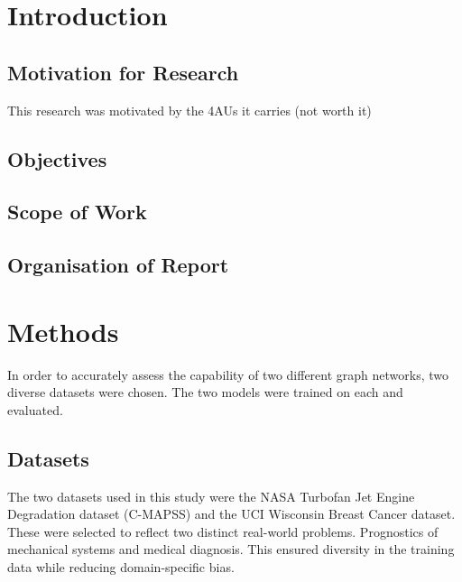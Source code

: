 \documentclass[12pt]{article}
\begin{document}
\pagebreak
\renewcommand{\cftdotsep}{0.5}
\renewcommand{\cftsecleader}{\cftdotfill{\cftdotsep}}
\renewcommand{\contentsname}{Table of Contents}  %
\setlength{\cftbeforesecskip}{10pt}   %
\setlength{\cftbeforesubsecskip}{10pt} %
\setlength{\cftbeforesubsubsecskip}{10pt} %
\renewcommand{\cftsecpresnum}{Chapter~} %
\renewcommand{\cftsecaftersnum}{\quad} 
\setlength{\cftsecnumwidth}{6.1em}   %
\tableofcontents

\pagebreak
{}
\section{Introduction}

\subsection{Motivation for Research}

This research was motivated by the 4AUs it carries (not worth it)

\subsection{Objectives}

\subsection{Scope of Work}

\subsection{Organisation of Report}

\pagebreak
\section{Methods}
In order to accurately assess the capability of two different graph networks, two diverse datasets were chosen. The two models were trained on each and evaluated.

\subsection{Datasets}
The two datasets used in this study were the NASA Turbofan Jet Engine Degradation dataset (C-MAPSS) and the UCI Wisconsin Breast Cancer dataset. These were selected to reflect two distinct real-world problems. Prognostics of mechanical systems and medical diagnosis. This ensured diversity in the training data while reducing domain-specific bias.
\end{document}
